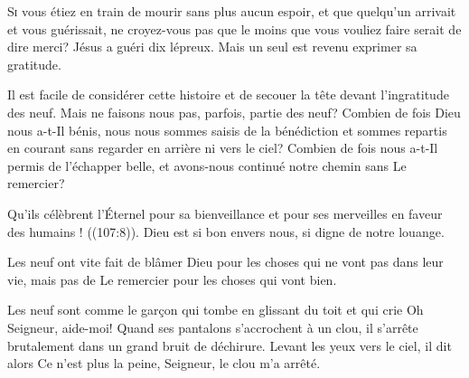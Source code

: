 
\dvrule







\lettrine{S}{i} vous étiez en train de mourir sans plus aucun espoir,
 et que quelqu'un arrivait et vous guérissait, ne croyez-vous pas
 que le moins que vous vouliez faire serait de dire merci?
 Jésus a guéri dix lépreux. Mais un seul est revenu exprimer sa gratitude.

Il est facile de considérer cette histoire et de secouer la tête
 devant l'ingratitude des neuf. Mais ne faisons nous pas, parfois,
 partie des neuf? Combien de fois Dieu nous a-t-Il bénis,
 nous nous sommes saisis de la bénédiction et sommes
 repartis en courant sans regarder en arrière ni vers le ciel?
 Combien de fois nous a-t-Il permis de l'échapper belle,
 et avons-nous continué notre chemin sans Le remercier?


\Og Qu'ils célèbrent l'Éternel pour sa bienveillance
 et pour ses merveilles en faveur des humains ! \Fg{}
 ((107:8)).
 Dieu est si bon envers nous, si digne de notre louange.

Les neuf ont vite fait de blâmer Dieu pour les choses qui ne vont pas
 dans leur vie, mais pas de Le remercier pour les choses qui vont bien.

Les neuf sont comme le gar\c{c}on qui tombe en glissant du toit
 et qui crie\frcolon{} 
 \Og Oh Seigneur, aide-moi! \Fg{} Quand ses pantalons s'accrochent à un clou,
 il s'arrête brutalement dans un grand bruit de déchirure.
 Levant les yeux vers le ciel, il dit alors\frcolon{} 
 \Og Ce n'est plus la peine, Seigneur, le clou m'a arrêté. \Fg{}

